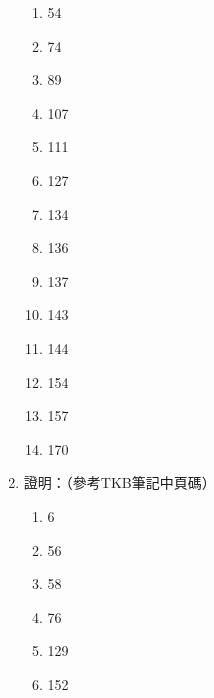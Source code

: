 \begin{enumerate}
\begin{enumerate}
        \item 54
        \item 74
        \item 89
        \item 107
        \item 111
        \item 127
        \item 134
        \item 136
        \item 137
        \item 143
        \item 144
        \item 154
        \item 157
        \item 170
    \end{enumerate}
    \item 證明：（參考TKB筆記\cite{4}中頁碼）
    \begin{enumerate}
        \item 6
        \item 56
        \item 58
        \item 76
        \item 129
        \item 152
    \end{enumerate}
\end{enumerate}

\pagebreak